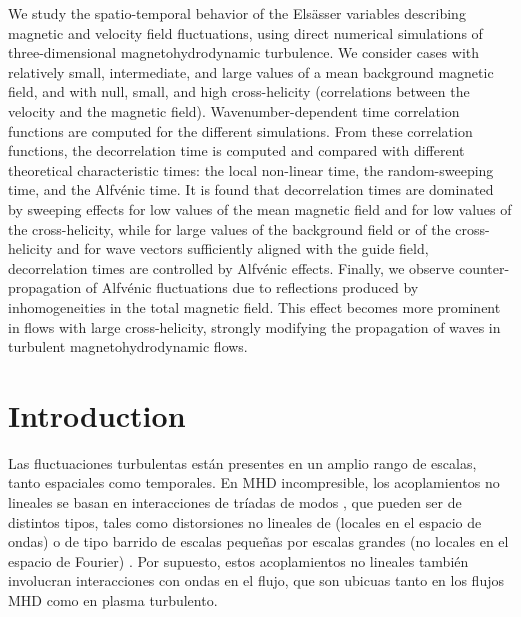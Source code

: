   We study the spatio-temporal behavior of the Els\"asser variables
  describing magnetic and velocity field fluctuations, using direct
  numerical simulations of three-dimensional magnetohydrodynamic
  turbulence. We consider cases with relatively small, intermediate,
  and large values of a mean background magnetic field, and with null,
  small, and high cross-helicity (correlations between the velocity
  and the magnetic field). Wavenumber-dependent time correlation
  functions are computed for the different simulations. From these
  correlation functions, the decorrelation time is computed and
  compared with different theoretical characteristic times: the local
  non-linear time, the random-sweeping time, and the Alfv\'enic
  time. It is found that decorrelation times are dominated by sweeping
  effects for low values of the mean magnetic field and for low values
  of the cross-helicity, while for large values of the background
  field or of the cross-helicity and for wave vectors sufficiently
  aligned with the guide field, decorrelation times are controlled by
  Alfv\'enic effects. Finally, we observe counter-propagation of
  Alfv\'enic fluctuations due to reflections produced by
  inhomogeneities in the total magnetic field. This effect becomes
  more prominent in flows with large cross-helicity, strongly
  modifying the propagation of waves in turbulent magnetohydrodynamic
  flows.

\section{Introduction}\label{sec_Intro}

Las fluctuaciones turbulentas están presentes en un amplio rango de
escalas, tanto espaciales como temporales. En MHD incompresible, los
acoplamientos no lineales se basan en interacciones de tríadas de
modos \cite{zhou_non-gaussian_1993, alexakis_turbulent_2007,
  teaca_energy_2009, aluie_2010, mininni_scale_2011}, que pueden ser
de distintos tipos, tales como distorsiones no lineales de \eddies
(locales en el espacio de ondas) o de tipo barrido de escalas pequeñas
por escalas grandes (no locales en el espacio de Fourier)
\cite{kraichnan_structure_1959, tennekes_eulerian_1975,
  chen_sweeping_1989, nelkin_time_1990, matthaeus_eulerian_2010,
  servidio_time_2011, carbone_anisotropy_2011}.  Por supuesto, estos
acoplamientos no lineales también involucran interacciones con ondas
en el flujo, que son ubicuas tanto en los flujos MHD como en plasma
turbulento.

